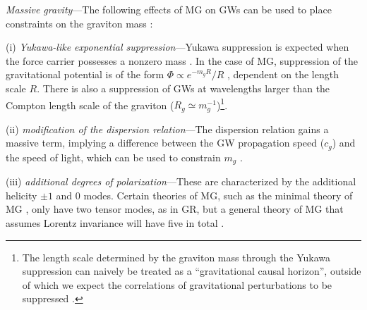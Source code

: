 \documentclass[10pt,prd,twocolumn,aps,nofootinbib,nobibnotes,superscriptaddress,preprintnumbers]{revtex4-2}
\begin{document}
\textit{Massive gravity}---The following effects of MG on GWs can be used to place constraints on the graviton mass \cite{deRham:2016nuf}:

(i) \textit{Yukawa-like exponential suppression}---Yukawa suppression is expected when the force carrier possesses a nonzero mass \cite{Will:1997bb}. In the case of MG, suppression of the gravitational potential is of the form $\Phi \propto e^{-m_gR}/R$ \cite{Will:1997bb}, dependent on the length scale $R$. There is also a suppression of GWs at wavelengths larger than the Compton length scale of the graviton ($R_g \simeq m_g^{-1}$)\footnote{The length scale determined by the graviton mass through the Yukawa suppression can naively be treated as a ``gravitational causal horizon'', outside of which we expect the correlations of gravitational perturbations to be suppressed \cite{Will:1997bb}.}.

(ii) \textit{modification of the dispersion relation}---The dispersion relation gains a massive term, implying a difference between the GW propagation speed ($c_g$) and the speed of light, which can be used to constrain $m_g$ \cite{LIGOScientific:2017vwq, LIGOScientific:2017zic, LIGOScientific:2017ync}. 

(iii) \textit{additional degrees of polarization}---These are characterized by the additional helicity $\pm 1$ and $0$ modes.
Certain theories of MG, such as the minimal theory of MG \cite{DeFelice:2015hla}, only have two tensor modes, as in GR, but a general theory of MG that assumes Lorentz invariance will have five in total \cite{Comelli:2013tja}.
\end{document}
